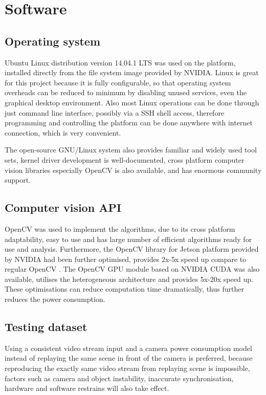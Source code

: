 \section{Software}

\subsection{Operating system}

Ubuntu Linux distribution version 14.04.1 LTS was used on the platform, installed directly from the file system image provided by NVIDIA. Linux is great for this project because it is fully configurable, so that operating system overheads can be reduced to minimum by disabling unused services, even the graphical desktop environment. Also most Linux operations can be done through just command line interface, possibly via a SSH shell access, therefore programming and controlling the platform can be done anywhere with internet connection, which is very convenient.

The open-source GNU/Linux system also provides familiar and widely used tool sets, kernel driver development is well-documented, cross platform computer vision libraries especially OpenCV is also available, and has enormous community support.

\subsection{Computer vision API}

OpenCV \cite{opencv} was used to implement the algorithms, due to its cross platform adaptability, easy to use and has large number of efficient algorithms ready for use and analysis. Furthermore, the OpenCV library for Jetson platform provided by NVIDIA had been further optimised, provides 2x-5x speed up compare to regular OpenCV \cite{NVIDIA:perf}. The OpenCV GPU module based on NVIDIA CUDA was also available, utilises the heterogeneous architecture and provides 5x-20x speed up. These optimisations can reduce computation time dramatically, thus further reduces the power consumption.

\subsection{Testing dataset}

Using a consistent video stream input and a camera power consumption model instead of replaying the same scene in front of the camera is preferred, because reproducing the exactly same video stream from replaying scene is impossible, factors such as camera and object instability, inaccurate synchronisation, hardware and software restrains will also take effect.

